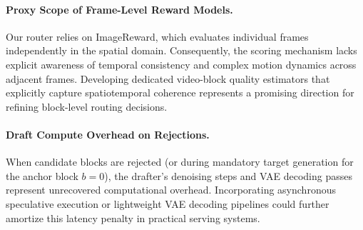\documentclass{article} %
\begin{document}
\paragraph{Proxy Scope of Frame-Level Reward Models.}
Our router relies on ImageReward, which evaluates individual frames independently in the spatial domain. Consequently, the scoring mechanism lacks explicit awareness of temporal consistency and complex motion dynamics across adjacent frames. Developing dedicated video-block quality estimators that explicitly capture spatiotemporal coherence represents a promising direction for refining block-level routing decisions.

\paragraph{Draft Compute Overhead on Rejections.}
When candidate blocks are rejected (or during mandatory target generation for the anchor block $b=0$), the drafter's denoising steps and VAE decoding passes represent unrecovered computational overhead. Incorporating asynchronous speculative execution or lightweight VAE decoding pipelines could further amortize this latency penalty in practical serving systems.


\end{document}
